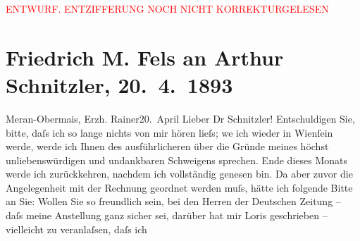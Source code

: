 
\begin{center}
            \textcolor{red}{ENTWURF. ENTZIFFERUNG NOCH NICHT KORREKTURGELESEN}
                      \end{center}
            
               \section[Friedrich M. Fels an Arthur Schnitzler, 20. 4. 1893]{ Friedrich M. Fels an Arthur Schnitzler, 20. 4. 1893}\nopagebreak{}\rehead{ }\begin{ledgroupsized}[t]{13cm}\normalsize\beginnumbering{} \toendnotes[C]{\smallbreak\pagebreak[2]} 
\toendnotes[C]{\smallbreak}\pstart
           \raggedleft{}{\pb}Meran-Obermais, Erzh. Rainer20. April \label{K_L00198_1v}\label{K_L00198_1h}\pend
           \pstart\center{}Lieber Dr Schnitzler!\pend\pstart
           Entschuldigen Sie, bitte, daſs ich so lange nichts von mir hören lieſs; we{\geminationn} ich wieder in Wienſein werde, werde ich Ihnen des
                    ausführlicheren über die Gründe meines höchst unliebenswürdigen und undankbaren
                    Schweigens sprechen. Ende dieses Monats werde ich zurückkehren, nachdem ich
                    vollständig genesen bin. Da aber zuvor die Angelegenheit mit der Rechnung
                    geordnet werden muſs, hätte ich folgende Bitte an Sie: Wollen Sie so freundlich
                    sein, bei den Herren der Deutschen Zeitung –
                    daſs meine Anstellung ganz sicher sei, darüber hat mir Loris geschrieben – vielleicht zu veranlaſsen, daſs ich

\end{ledgroupsized}
